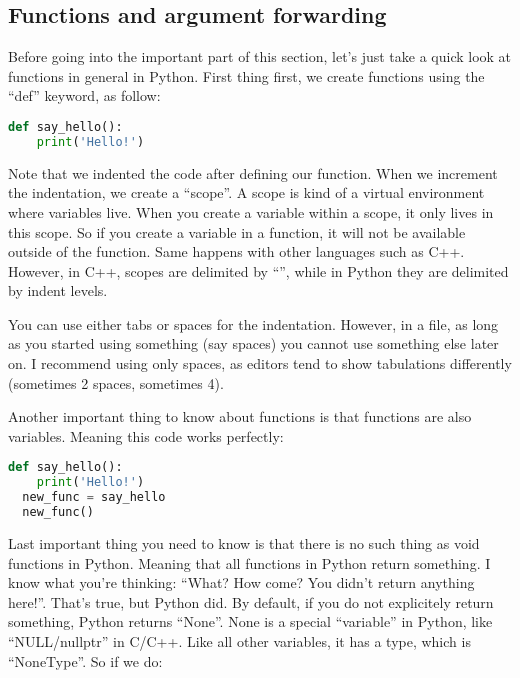 \subsection{Functions and argument forwarding}
Before going into the important part of this section, let's just take a quick look
at functions in general in Python. First thing first, we create functions using
the ``def'' keyword, as follow:

\begin{lstlisting}[language=python]
  def say_hello():
    print('Hello!')
\end{lstlisting}

Note that we indented the code after defining our function. When we increment the
indentation, we create a ``scope''. A scope is kind of a virtual environment where variables live.
When you create a variable within a scope, it only lives in this scope. So if you create
a variable in a function, it will not be available outside of the function. Same happens with
other languages such as C++. However, in C++, scopes are delimited by ``{}'', while in Python they
are delimited by indent levels.

\vspace{5mm}

You can use either tabs or spaces for the indentation. However, in a file, as long as you started
using something (say spaces) you cannot use something else later on. I recommend using only spaces,
as editors tend to show tabulations differently (sometimes 2 spaces, sometimes 4).

\vspace{5mm}

Another important thing to know about functions is that functions are also variables. Meaning this
code works perfectly:

\begin{lstlisting}[language=python]
  def say_hello():
    print('Hello!')
  new_func = say_hello
  new_func()
\end{lstlisting}

Last important thing you need to know is that there is no such thing as void functions in Python.
Meaning that all functions in Python return something. I know what you're thinking: ``What? How come?
You didn't return anything here!''. That's true, but Python did. By default, if you do not explicitely
return something, Python returns ``None''. None is a special ``variable'' in Python,
like ``NULL/nullptr'' in C/C++. Like all other variables, it has a type, which is ``NoneType''.
So if we do:

